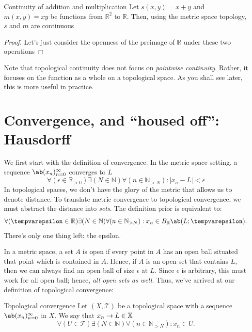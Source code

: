 \begin{prop}{Continuity of addition and multiplication}{}
  Let \(s(x, y) = x + y\) and \(m(x, y) = xy\) be functions from \(\mathbb{R}^2\) to
  \(\mathbb{R}\). Then, using the metric space topology, \(s\) and \(m\) are continuous
\end{prop}

\begin{proof}
  Let's just consider the openness of the preimage of \(\mathbb{R}\) under these two operations
\end{proof}

Note that topological continuity does not focus on \emph{pointwise continuity}. Rather,
it focuses on the function as a whole on a topological space. As you shall see later,
this is more useful in practice.

\section{Convergence, and ``housed off'': Hausdorff}

We first start with the definition of convergence. In the metric space setting, a
sequence \(\sequence{x_n}{n = 0}{\infty}\) converges to \(L\) \ifft
\begin{equation}
  \forall (\epsilon \in \mathbb{R}_{>0}) \exists (N \in \mathbb{N}) \forall (n \in \mathbb{N}_{>N}) : |x_n - L| < \epsilon
\end{equation}
In topological spaces, we don't have the glory of the metric that allows us to denote
distance. To translate metric convergence to topological convergence, we must abstract
the distance into \emph{sets}. The definition prior is equivalent to:
\begin{equation}
  \forall (\epsilon \in \mathbb{R}) \exists (N \in \mathbb{N}) \forall (n \in \mathbb{N}_{>N}) : x_n \in \oball{\mathbb{R}}{L}{\epsilon}.
\end{equation}
There's only one thing left: the epsilon.

In a metric space, a set \(A\) is open if every point in \(A\) has an open ball
situated that point which is contained in \(A\). Hence, if \(A\) is an open set that
contains \(L\), then we can always find an open ball of size \(\epsilon\) at \(L\).
Since \(\epsilon\) is arbitrary, this must work for all open ball; hence, \emph{all
open sets as well}. Thus, we've arrived at our definition of topological convergence:

\begin{df}{Topological convergence}{}
  Let \((X, \mathcal{T})\) be a topological space with a sequence \(\sequence{x_n}{n = 0}{\infty}\)
  in \(X\). We say that \(x_n \rightarrow L \in \mathbb{X}\) \ifft
  \begin{equation}
    \forall (U \in \mathcal{T}) \exists (N \in \mathbb{N}) \forall (n \in \mathbb{N}_{>N}) : x_n \in U.
  \end{equation}
\end{df}

